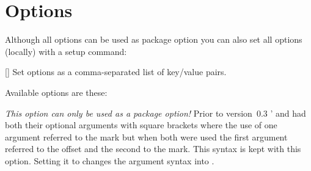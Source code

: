 \documentclass[load-preamble+]{cnltx-doc}
\begin{document}
\section{Options}\label{sec:options}
Although all options can be used as package option you can also set all options
(locally) with a setup command:
\begin{commands}
  []
    Set options as a comma-separated list of key/value pairs.
\end{commands}
Available options are these:
\begin{options}
  \label{key:dblarg}%
    \emph{This option can only be used as a package option!}  Prior to
    version~0.3 \snotez'  and  had both their
    optional arguments with square brackets where the use of one argument
    referred to the mark but when both were used the first argument referred
    to the offset and the second to the mark.  This syntax is kept with this
    option.  Setting it to  changes the  argument
    syntax into .
    

\end{options}
\end{document}
